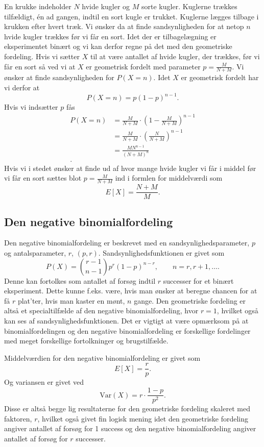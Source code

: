 \begin{eks}
  En krukke indeholder $N$ hvide kugler og $M$ sorte kugler. Kuglerne trækkes tilfældigt, én ad gangen, indtil en sort kugle er trukket. Kuglerne lægges tilbage i krukken efter hvert træk. Vi ønsker da at finde sandsynligheden for at netop $n$ hvide kugler trækkes før vi får en sort. Idet der er tilbagelægning er eksperimentet binært og vi kan derfor regne på det med den geometriske fordeling. Hvis vi sætter $X$ til at være antallet af hvide kugler, der trækkes, før vi får en sort så ved vi at $X$ er geometrisk fordelt med parameter $p = \frac{M}{N + M}$. Vi ønsker at finde sandsynligheden for $P(X = n)$. Idet $X$ er geometrisk fordelt har vi derfor at
  \[ 
  P(X = n) = p(1-p)^{n-1}
  .\]
  Hvis vi indsætter $p$ fås
  \begin{align*}
    P(X = n) &= \frac{M}{N + M}\cdot \left( 1 - \frac{M}{N+M} \right)^{n-1} \\
    &= \frac{M}{N + M}\cdot \left( \frac{N}{N + M} \right)^{n-1} \\
    &= \frac{MN^{n-1}}{(N + M)^n} \\
  .\end{align*}
  \vspace{12pt}
  Hvis vi i stedet ønsker at finde ud af hvor mange hvide kugler vi får i middel før vi får en sort sættes blot $p = \frac{M}{N + M}$ ind i formlen for middelværdi som
  \[ 
    E[X] = \frac{N + M}{M}
  .\]
\end{eks}

\subsection{Den negative binomialfordeling}
Den negative binomialfordeling er beskrevet med en sandsynlighedsparameter, $p$ og antalsparameter, $r$, $(p,r)$. Sandsynlighedsfunktionen er givet som
\[ 
  P(X) = \binom{r-1}{n-1} p^{r}(1-p)^{n-r}, \qquad n = r, r+1, \ldots 
.\]
Denne kan fortolkes som antallet af forsøg indtil $r$ successer for et binært eksperiment. Dette kunne f.eks. være, hvis man ønsker at beregne chancen for at få $r$ plat'ter, hvis man kaster en mønt, $n$ gange. Den geometriske fordeling er altså et specialtilfælde af den negative binomialfordeling, hvor $r = 1$, hvilket også kan ses af sandsynlighedsfunktionen. Det er vigtigt at være opmærksom på at binomialfordelingen og den negative binomialfordeling er forskellige fordelinger med meget forskellige fortolkninger og brugstilfælde. 

\begin{sæt}
  Middelværdien for den negative binomialfordeling er givet som
  \[ 
    E[X] = \frac{r}{p}
  .\]
  Og variansen er givet ved
  \[ 
    \mathrm{Var}(X) = r\cdot \frac{1-p}{p^2}
  .\]
  Disse er altså begge lig resultaterne for den geometriske fordeling skaleret med faktoren, $r$, hvilket også givet fin logisk mening idet den geometriske fordeling angiver antallet af forsøg for 1 success og den negative binomialfordeling angiver antallet af forsøg for $r$ successer.
\end{sæt}

